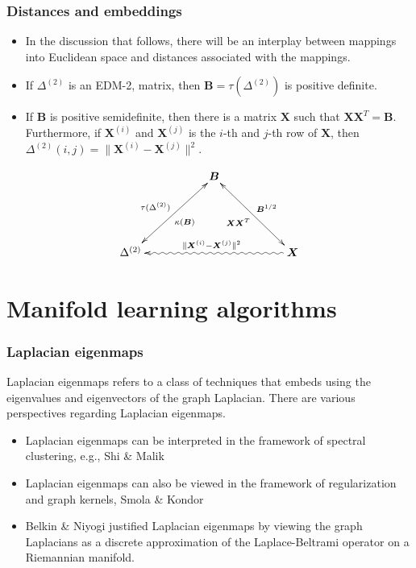 \documentclass[professionalfonts, hyperref={pdfpagelabels=false,
  colorlinks=true, linkcolor=purple}]{beamer}
\begin{document}
\begin{frame}
  \frametitle{Distances and embeddings}
  \begin{itemize}
  \item In the discussion that follows, there will be an interplay
    between mappings into Euclidean space and distances associated
    with the mappings.
  \item If $\Delta^{(2)}$ is an EDM-2, matrix, then $\bm{B}
    = \tau(\Delta^{(2)})$ is positive definite.  
  \item If $\bm{B}$ is positive semidefinite, then there is a
    matrix $\bm{X}$ such that $\bm{X} \bm{X}^{T} =
    \bm{B}$. Furthermore, if $\bm{X}^{(i)}$ and $\bm{X}^{(j)}$ is the
    $i$-th and $j$-th row of $\bm{X}$, then $\Delta^{(2)}(i,j) = \|
    \bm{X}^{(i)} - \bm{X}^{(j)} \|^2$.
  \end{itemize}
  \begin{exampleblock}{}
    \begin{equation*}
      \xymatrix{
        & & \bm{B} \ar@{<->}[ddll]^{\kappa(\bm{B})}_{\tau(\Delta^{(2)})}
        \ar@{<->}[ddrr]^{\bm{B}^{1/2}}_{\bm{X}\bm{X}^{T}} & &\\ 
        \\
        \Delta^{(2)} \ar@{<~}[rrrr]^{\|\bm{X}^{(i)} -
          \bm{X}^{(j)}\|^{2}} & & & & \bm{X} 
      }
    \end{equation*}
  \end{exampleblock}
\end{frame}
\section{Manifold learning algorithms}
\begin{frame}
  \frametitle{Laplacian eigenmaps}
  Laplacian eigenmaps refers to a class of techniques
  that embeds using the eigenvalues and eigenvectors of the graph
  Laplacian. There are various perspectives regarding
  Laplacian eigenmaps. 
  \begin{itemize}
  \item Laplacian eigenmaps can be interpreted in the framework of
    spectral clustering, e.g., Shi \& Malik
    \cite{shi00:_normal}
  \item Laplacian eigenmaps can also be viewed in the framework of
    regularization and graph kernels, Smola \& Kondor
    \cite{smola03:_kernel}
  \item Belkin \& Niyogi \cite{belkin03:_laplac} justified Laplacian
    eigenmaps by viewing the graph Laplacians as a discrete
    approximation of the Laplace-Beltrami operator on a Riemannian
    manifold.  
  \end{itemize}
\end{frame}
\end{document}
